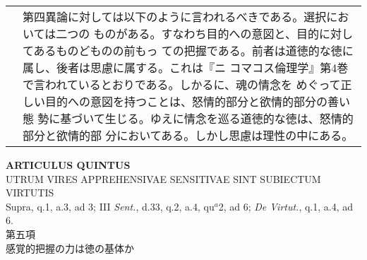 \documentclass[10pt]{jsarticle}
\begin{document}
\begin{longtable}{p{21em}p{21em}}
&

第四異論に対しては以下のように言われるべきである。選択においては二つの
ものがある。すなわち目的への意図と、目的に対してあるものどものの前もっ
ての把握である。前者は道徳的な徳に属し、後者は思慮に属する。これは『ニ
コマコス倫理学』第4巻で言われているとおりである。しかるに、魂の情念を
めぐって正しい目的への意図を持つことは、怒情的部分と欲情的部分の善い態
勢に基づいて生じる。ゆえに情念を巡る道徳的な徳は、怒情的部分と欲情的部
分においてある。しかし思慮は理性の中にある。


\end{longtable}
\newpage


\begin{center}
{\Large {\bf ARTICULUS QUINTUS}}\\
{\large UTRUM VIRES APPREHENSIVAE SENSITIVAE SINT SUBIECTUM VIRTUTIS}\\
{\footnotesize Supra, q.1, a.3, ad 3; III {\itshape Sent.}, d.33, q.2, a.4, qu$^{a}$2, ad 6; {\itshape De Virtut.}, q.1, a.4, ad 6.}\\
{\Large 第五項\\感覚的把握の力は徳の基体か}
\end{center}
\end{document}
